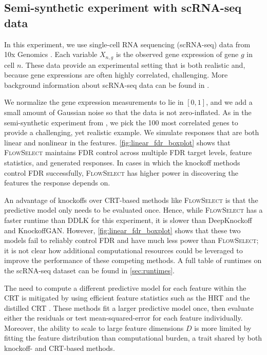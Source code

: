 \documentclass{article}
\newcommand{\FlowSelect}{\textsc{FlowSelect}\xspace}
\newcommand{\FlowSelectNS}{\textsc{FlowSelect}}
\begin{document}
\subsection{Semi-synthetic experiment with scRNA-seq data}\label{sec:rnasq}

In this experiment, we use single-cell RNA sequencing (scRNA-seq) data from 10x Genomics \citep{rnasq_tenx}.
Each variable $X_{n, g}$ is the observed gene expression of gene $g$ in cell $n$.
These data provide an experimental setting that is both realistic and, because gene expressions are often highly correlated, challenging.
More background information about scRNA-seq data can be found in \citet{agarwal2020data}.

We normalize the gene expression measurements to lie in $[0, 1]$,
and we add a small amount of Gaussian noise so that the data is not zero-inflated.
As in the semi-synthetic experiment from \citet{sudarshanDeepDirectLikelihood2020}, we pick the 100 most correlated genes to provide a challenging, yet realistic example.
We simulate responses that are both linear and nonlinear in the features.
\cref{fig:linear_fdr_boxplot} shows that \FlowSelect maintains FDR control across multiple FDR target levels, feature statistics, and generated responses.
In cases in which the knockoff methods control FDR successfully, \FlowSelect has higher power in discovering the features the response depends on.

An advantage of knockoffs over CRT-based methods like \FlowSelect is that the predictive model only needs to be evaluated once.
Hence, while \FlowSelect has a faster runtime than DDLK for this experiment, it is slower than DeepKnockoff and KnockoffGAN.
However, \cref{fig:linear_fdr_boxplot} shows that these two models fail to reliably control FDR and have much less power than \FlowSelectNS; it is not clear how additional computational resources could be leveraged to improve the performance of these competing methods.
A full table of runtimes on the scRNA-seq dataset can be found in \cref{sec:runtimes}.

The need to compute a different predictive model for each feature within the CRT is mitigated by using efficient feature statistics such as the HRT \citep{tanseyHoldoutRandomizationTest2019} and the distilled CRT \citep{liuFastPowerfulConditional2020}.
These methods fit a larger predictive model once, then evaluate either the residuals or test mean-squared-error for each feature individually.
Moreover, the ability to scale to large feature dimensions $D$ is more limited by fitting the feature distribution than computational burden, a trait shared by both knockoff- and CRT-based methods.
\end{document}
